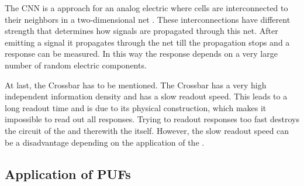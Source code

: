 The \ac{CNN} \puf is a approach for an analog electric \puf where cells are interconnected to their neighbors in a two-dimensional net \cite{Csaba2010ApplicationCryptography}.
These interconnections have different strength that determines how signals are propagated through this net.
After emitting a signal it propagates through the net till the propagation stops and a response can be measured.
In this way the response depends on a very large number of random electric components.

At last, the Crossbar \puf has to be mentioned.
The Crossbar \puf has a very high independent information density and has a slow readout speed.
This leads to a long readout time and is due to its physical construction, which makes it impossible to read out all responses. 
Trying to readout responses too fast destroys the circuit of the \puf and therewith the \puf itself.
However, the slow readout speed can be a disadvantage depending on the application of the \puf \cite{Ruhrmair2010StrongProofs}.


\subsection{Application of PUFs}
\label{sec:applicationsofpufs}

